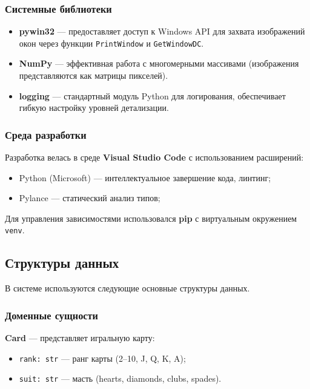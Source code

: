 \subsubsection*{Системные библиотеки}

\begin{itemize}
    \item \textbf{pywin32} --- предоставляет доступ к Windows API для захвата изображений окон через функции \texttt{PrintWindow} и \texttt{GetWindowDC}.
    \item \textbf{NumPy} --- эффективная работа с многомерными массивами (изображения представляются как матрицы пикселей).
    \item \textbf{logging} --- стандартный модуль Python для логирования, обеспечивает гибкую настройку уровней детализации.
\end{itemize}

\subsubsection*{Среда разработки}

Разработка велась в среде \textbf{Visual Studio Code} с использованием расширений:
\begin{itemize}
    \item Python (Microsoft) --- интеллектуальное завершение кода, линтинг;
    \item Pylance --- статический анализ типов;
\end{itemize}

Для управления зависимостями использовался \textbf{pip} с виртуальным окружением \texttt{venv}.

\subsection{Структуры данных}

В системе используются следующие основные структуры данных.

\subsubsection*{Доменные сущности}

\textbf{Card} --- представляет игральную карту:
\begin{itemize}
    \item \texttt{rank: str} --- ранг карты (2--10, J, Q, K, A);
    \item \texttt{suit: str} --- масть (hearts, diamonds, clubs, spades).
\end{itemize}

